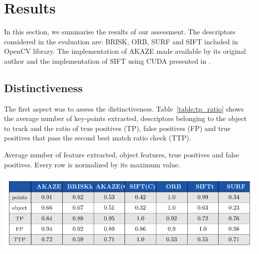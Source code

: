 \section{Results}

In this section, we summarise the results of our assessment. The descriptors considered in the evaluation are: BRISK, ORB, SURF and SIFT included in OpenCV library. The implementation of AKAZE made available by its original author \cite{alcantarilla13} and the implementation of SIFT using CUDA presented in \cite{bjorkmann14}.

\subsection{Distinctiveness}


The first aspect was to assess the distinctiveness. Table~\ref{table:tp_ratio} shows the average number of key-points extracted, descriptors belonging to the object to track and the ratio of true positives (TP), false positives (FP) and true positives that pass the second best match ratio check (TTP). 

\begin{table}[!h]
\caption{Average number of feature extracted, object features, true positives and false positives. Every row is normalized by its maximum value.}
\vspace{-2mm} 
\centerline{%
		\includegraphics[width=0.98\linewidth]{tables/descriptivness_ratio.pdf}}
    \vspace{-2mm} 
	\label{table:tp_ratio}
\end{table}

